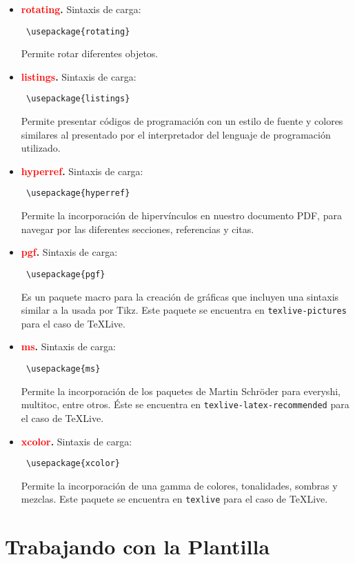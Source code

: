 \begin{itemize}
\item \textbf{\textcolor{red}{rotating}.}  Sintaxis de carga:  \begin{verbatim} \usepackage{rotating}
\end{verbatim} Permite rotar diferentes objetos.
\item \textbf{\textcolor{red}{listings}.}  Sintaxis de carga:  \begin{verbatim} \usepackage{listings}
\end{verbatim} Permite presentar códigos de programación con un estilo de fuente y colores similares al presentado por el interpretador del lenguaje de programación utilizado.
\item \textbf{\textcolor{red}{hyperref}.}  Sintaxis de carga:  \begin{verbatim} \usepackage{hyperref}  
\end{verbatim}Permite la incorporación de hipervínculos en nuestro documento PDF, para navegar por las diferentes secciones, referencias y citas.
\item \textbf{\textcolor{red}{pgf}.}  Sintaxis de carga:  \begin{verbatim} \usepackage{pgf}  
\end{verbatim} Es un paquete macro para la creación de gráficas que incluyen una sintaxis similar a la usada por Tikz. Este paquete se encuentra en \texttt{texlive-pictures} para el caso de TeXLive.
\item \textbf{\textcolor{red}{ms}.}  Sintaxis de carga:  \begin{verbatim} \usepackage{ms}  
\end{verbatim}Permite la incorporación de los paquetes de Martin Schröder para everyshi, multitoc, entre otros. Éste se encuentra en \texttt{texlive-latex-recommended} para el caso de TeXLive.
\item \textbf{\textcolor{red}{xcolor}.}  Sintaxis de carga:  \begin{verbatim} \usepackage{xcolor}  
\end{verbatim}Permite la incorporación de una gamma de colores, tonalidades, sombras y mezclas. Este paquete se encuentra en \texttt{texlive} para el caso de TeXLive.
\end{itemize}

\section{Trabajando con la Plantilla}


